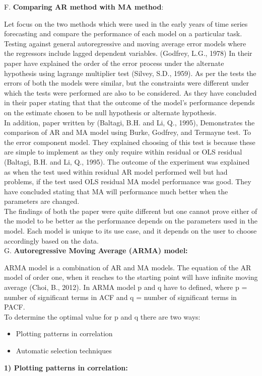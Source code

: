 \documentclass[12pt,a4paper]{article}
\begin{document}
\begin{flushleft}
		F.	\textbf{Comparing AR method with MA method}:
		
		Let focus on the two methods which were used in the early years of time series forecasting and compare the performance of each model on a particular task. Testing against general autoregressive and moving average error models where the regressors include lagged dependent variables. (Godfrey, L.G., 1978) In their paper have explained the order of the error process under the alternate hypothesis using lagrange multiplier test (Silvey, S.D., 1959). As per the tests the errors of both the models were similar, but the constraints were  different under which the tests were performed are also to be considered. As they have concluded in their paper stating that that the outcome of the model’s performance depends on the estimate chosen to be null hypothesis or alternate hypothesis.\\
		
		In addition, paper written by (Baltagi, B.H. and Li, Q., 1995), Demonstrates the comparison of AR and MA model using Burke, Godfrey, and Termayne test. To the error component model. They explained choosing of this test is because these are simple to implement as they only require within residual or OLS residual (Baltagi, B.H. and Li, Q., 1995). The outcome of the experiment was explained as when the test used within residual AR model performed well but had problems, if the test used OLS residual MA model performance was good. They have concluded stating that MA will performance much better when the parameters are changed.\\
		
		The findings of both the paper were quite different but one cannot prove either of the model to be better as the performance depends on the parameters used in the model. Each model is unique to its use case, and it depends on the user to choose accordingly based on the data.\\
		
		G.	\textbf{Autoregressive Moving Average (ARMA) model:}
		
		ARMA model is a combination of AR and MA models. The equation of the AR model of order one, when it reaches to the starting point will have infinite moving average (Choi, B., 2012). In ARMA model p and q have to defined, where p = number of significant terms in ACF and q = number of significant terms in PACF.\\
		
		To determine the optimal value for p and q there are two ways:
		\begin{itemize}
	    \item	Plotting patterns in correlation
		\item	Automatic selection techniques
		\end{itemize}
		\textbf{1) Plotting patterns in correlation: }
		

\end{flushleft}
\end{document}

